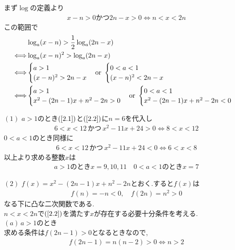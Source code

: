 \documentclass[main]{subfiles}
\begin{document}
\begin{answer}
まず$\log$の定義より
\begin{align}
x-n>0 \text{かつ}2n-x>0 \Longleftrightarrow n<x<2n \label{2.1} %
\end{align}
この範囲で
\begin{align}
&\log_{a}(x-n) > \frac{1}{2} \log_{a} (2n-x) \notag \\
\Longleftrightarrow
&\log_{a}(x-n)^{2} > \log_{a} (2n-x) \notag \\
\Longleftrightarrow
&\begin{cases}
a>1 \\
(x-n)^{2} > 2n-x
\end{cases}
\text{or} \,\,
\begin{cases}
0 <a <1 \\
(x-n)^{2} < 2n-x
\end{cases} \notag \\
\Longleftrightarrow
&\begin{cases}
a>1 \\
x^{2} - (2n-1) x + n^{2} -2n >0
\end{cases}
\text{or} \,\,
\begin{cases}
0 <a <1 \\
x^{2} - (2n-1) x + n^{2} -2n <0
\end{cases} \label{2.2} %
\end{align}

 

$(1) $
$a>1$のとき$(\ref{2.1})$と$(\ref{2.2})$に$n=6$を代入し
\begin{align*}
6< x <12 \, \text{かつ} \, x^{2} -11x +24>0 \Longleftrightarrow 8 < x <12
\end{align*}
$0<a<1$のとき同様に
\begin{align*}
6< x <12 \, \text{かつ} \, x^{2} -11x +24<0 \Longleftrightarrow 6 < x < 8
\end{align*}
以上より求める整数$x$は
\begin{align*}
a>1 \text{のとき} x=9, 10, 11 \quad 0<a<1 \text{のとき} x=7
\end{align*}

 

$(2) $
$f(x)=x^{2} - (2n-1) x + n^{2} -2n$とおく.すると$f(x)$は
\begin{align*}
f(n)= -n <0 , \quad f(2n)=n^{2} >0
\end{align*}
なる下に凸な二次関数である.\\
$n<x<2n$で$(\ref{2.2})$を満たす$x$が存在する必要十分条件を考える.\\
$(a) \, a>1$のとき \\
求める条件は$f(2n-1)>0$となるときなので,
\begin{align*}
f(2n-1)=n(n-2) >0 \Longleftrightarrow n>2
\end{align*}


\end{answer}
\end{document}

